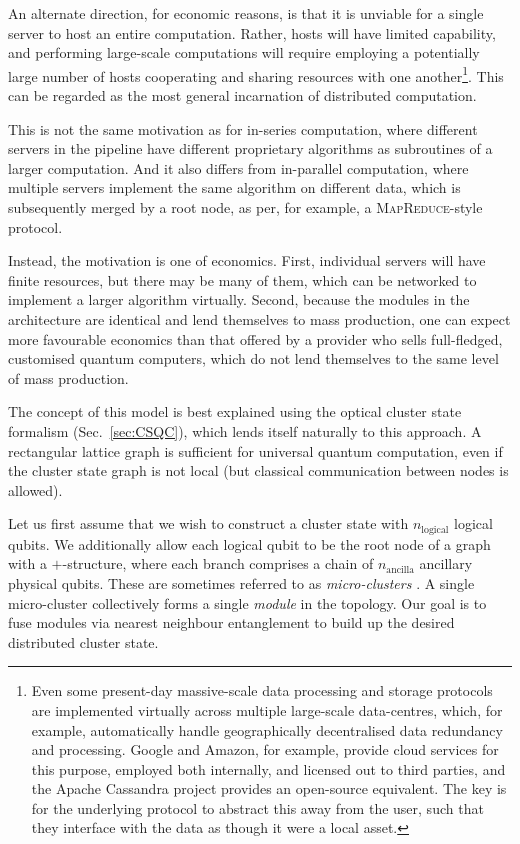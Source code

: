 \documentclass[aps,rmp,twocolumn,amsmath,amssymb,nofootinbib,superscriptaddress,longbibliography,floatfix,table-of-contents,eqsecnum]{revtex4-1}
\begin{document}
An alternate direction, for economic reasons, is that it is unviable for a single server to host an entire computation. Rather, hosts will have limited capability, and performing large-scale computations will require employing a potentially large number of hosts cooperating and sharing resources with one another\footnote{Even some present-day massive-scale data processing and storage protocols are implemented virtually across multiple large-scale data-centres, which, for example, automatically handle geographically decentralised data redundancy and processing. Google and Amazon, for example, provide cloud services for this purpose, employed both internally, and licensed out to third parties, and the Apache Cassandra project provides an open-source equivalent. The key is for the underlying protocol to abstract this away from the user, such that they interface with the data as though it were a local asset.}. This can be regarded as the most general incarnation of distributed computation.

This is not the same motivation as for in-series computation, where different servers in the pipeline have different proprietary algorithms as subroutines of a larger computation. And it also differs from in-parallel computation, where multiple servers implement the same algorithm on different data, which is subsequently merged by a root node, as per, for example, a \textsc{MapReduce}-style protocol.

Instead, the motivation is one of economics. First, individual servers will have finite resources, but there may be many of them, which can be networked to implement a larger algorithm virtually. Second, because the modules in the architecture are identical and lend themselves to mass production, one can expect more favourable economics than that offered by a provider who sells full-fledged, customised quantum computers, which do not lend themselves to the same level of mass production.

The concept of this model is best explained using the optical cluster state formalism (Sec.~\ref{sec:CSQC}), which lends itself naturally to this approach. A rectangular lattice graph is sufficient for universal quantum computation, even if the cluster state graph is not local (but classical communication between nodes is allowed).

Let us first assume that we wish to construct a cluster state with $n_\text{logical}$ logical qubits. We additionally allow each logical qubit to be the root node of a graph with a $+$-structure, where each branch comprises a chain of $n_\text{ancilla}$ ancillary physical qubits. These are sometimes referred to as \textit{micro-clusters} \cite{bib:Nielsen04}. A single micro-cluster collectively forms a single \textit{module} in the topology. Our goal is to fuse modules via nearest neighbour entanglement to build up the desired distributed cluster state.
\end{document}

